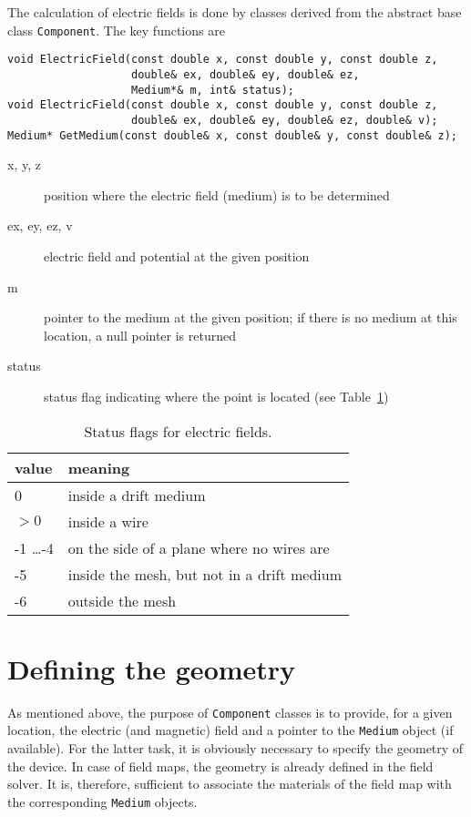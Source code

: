 The calculation of electric fields is done by classes 
derived from the abstract base class \texttt{Component}. 
The key functions are 
\begin{lstlisting}
void ElectricField(const double x, const double y, const double z,
                   double& ex, double& ey, double& ez,
                   Medium*& m, int& status);
void ElectricField(const double x, const double y, const double z,
                   double& ex, double& ey, double& ez, double& v);
Medium* GetMedium(const double& x, const double& y, const double& z);
\end{lstlisting}
\begin{description}
  \item[x, y, z] 
  position where the electric field (medium) is to be determined
  \item[ex, ey, ez, v] 
  electric field and potential at the given position
  \item[m] pointer to the medium at the given position; 
  if there is no medium at this location, a null pointer is returned
  \item[status] status flag indicating where the point is located
  (see Table~\ref{Tab:StatusFlagsField})
\end{description}

\begin{table} 
  \centering
  \caption{Status flags for electric fields.}
  \label{Tab:StatusFlagsField}
  \begin{tabular}{l l}
  \toprule
  value & meaning \\
  \midrule
    0   & inside a drift medium \\
  \(> 0\) & inside a wire \\
   -1 \dots -4  &  on the side of a plane where no wires are \\
   -5   & inside the mesh, but not in a drift medium \\
   -6   & outside the mesh \\
  \bottomrule
  \end{tabular}
\end{table}

\section{Defining the geometry}

As mentioned above, the purpose of \texttt{Component} classes is to 
provide, for a given location, the electric (and magnetic) field and a pointer to the 
\texttt{Medium} object (if available).
For the latter task, it is obviously necessary to specify the geometry 
of the device. 
In case of field maps, the geometry is already defined in the field solver. 
It is, therefore, sufficient to associate the materials 
of the field map with the corresponding \texttt{Medium} objects. 


